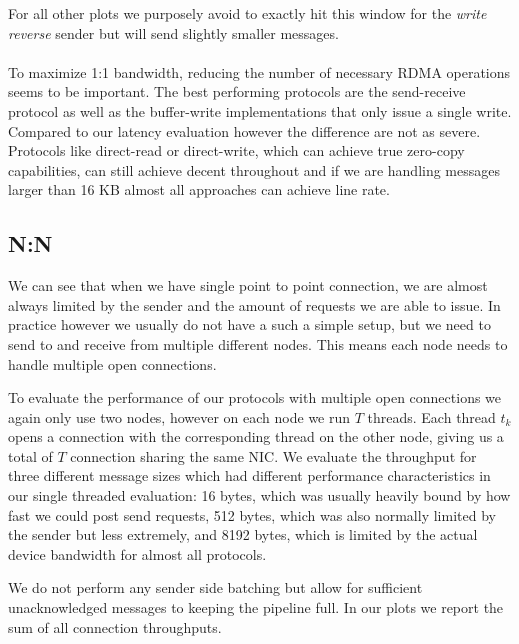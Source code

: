 For all other plots we purposely avoid to exactly hit this window for the \emph{write reverse}
sender but will send slightly smaller messages.


\paragraph{} To maximize 1:1 bandwidth, reducing the number of necessary RDMA operations seems to be important.
The best performing protocols are the send-receive 
protocol as well as the buffer-write implementations that only issue a single write. Compared to our latency evaluation
however the difference are not as severe. 
Protocols like direct-read or direct-write, which can achieve true zero-copy capabilities, can still achieve decent 
throughout and if we are handling messages larger than 16 KB almost all approaches can achieve line rate.








\pagebreak
\subsection{N:N}


We can see that when we have single point to point connection, we are almost always limited by the sender and the 
amount of requests we are able to issue. In practice however we usually do not have a such a simple setup, but we
need to send to and receive from multiple different nodes. This means each node needs to handle multiple open
connections. 

To evaluate the performance of our protocols with multiple open connections we again only use two nodes, however  
on each node we run $T$ threads. Each thread $t_k$ opens a connection with the corresponding 
thread on the other node, giving us a total of $T$ connection sharing the same NIC. We evaluate the throughput for 
three different message sizes which had different performance characteristics in our single threaded evaluation: 16 bytes, 
which was usually heavily bound by how fast we could post send requests, 512 bytes, which was also normally limited by the 
sender but less extremely, and 8192 bytes, which is limited by the actual device bandwidth for almost all protocols. 

We do not perform any sender side batching but allow for sufficient unacknowledged messages to keeping the pipeline full.
In our plots we report the sum of all connection throughputs.

